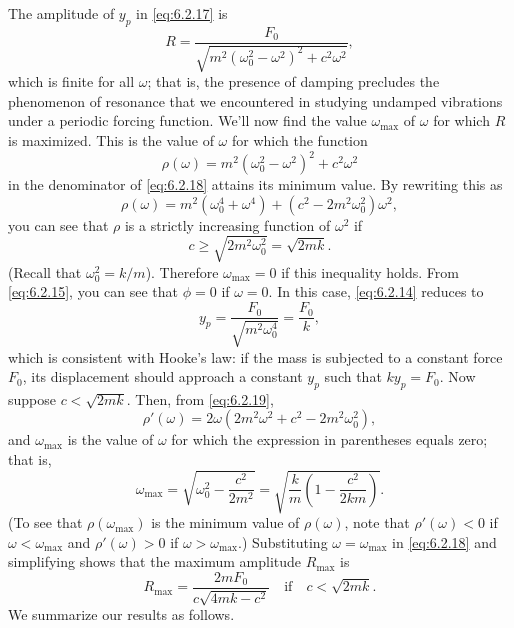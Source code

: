 \documentclass{ximera}
\begin{document}
The amplitude of $y_p$ in \eqref{eq:6.2.17} is
\begin{equation}\label{eq:6.2.18}
R=\frac{F_0}{\sqrt{m^2(\omega^2_0-\omega^2)^2+c^2\omega^2}},
\end{equation}
which is finite for all $\omega$; that is, the presence of damping
precludes the phenomenon of resonance that we encountered in studying
undamped vibrations under a periodic forcing function. We'll now
find the value $\omega_{\max}$ of $\omega$ for which $R$ is maximized.
This is the value of $\omega$ for which the function
$$
\rho (\omega)=m^2(\omega^2_0-\omega^2)^2+c^2\omega^2
$$
in the denominator of  \eqref{eq:6.2.18} attains its minimum value.  By
rewriting this as
\begin{equation}\label{eq:6.2.19}
\rho (\omega)=m^2(\omega^4_0+\omega^4)+
 (c^2-2m^2\omega^2_0)\omega^2,
\end{equation}
 you can see that $\rho$ is a strictly
increasing function of $\omega^2$ if
$$
c\geq\sqrt{2m^2\omega^2_0}=\sqrt{2mk}.
$$
(Recall that $\omega^2_0=k/m$). Therefore $\omega_{\max}=0$ if this
inequality holds. From \eqref{eq:6.2.15}, you can see that $\phi=0$ if
$\omega=0$. In this case, \eqref{eq:6.2.14} reduces to
$$
y_p=\frac{F_0}{\sqrt{m^2\omega^4_0}}=\frac{F_0}{k},
$$
which is consistent with Hooke's law: if the mass is subjected to a
constant force $F_0$,  its displacement should approach a constant
$y_p$ such that $ky_p=F_0$. Now suppose   $c<\sqrt{2mk}$. Then,
from \eqref{eq:6.2.19},
$$
\rho'(\omega)=2\omega(2m^2\omega^2+c^2-2m^2\omega^2_0),
$$
and $\omega_{\max}$ is the value of $\omega$ for which the
expression in parentheses equals zero; that is,
$$
\omega_{\max}=\sqrt{\omega^2_0-\frac{c^2}{2m^2}}
=\sqrt{\frac{k}{m}\left(1-\frac{c^2}{2km}\right)}.
$$
(To see that $\rho(\omega_{\max})$ is the minimum value of
$\rho(\omega)$, note that $\rho'(\omega)<0$ if $\omega
<\omega_{\max}$ and $\rho'(\omega)>0$ if $\omega>\omega_{\max}$.)
Substituting $\omega=\omega_{\max}$ in \eqref{eq:6.2.18} and simplifying
shows that the maximum amplitude $R_{\max}$ is
$$
R_{\max}=\frac{2mF_0}{c\sqrt{4mk-c^2}}\quad \mbox{if}\quad c<
\sqrt{2mk}.
$$
We summarize our results  as follows.
 
\end{document}
